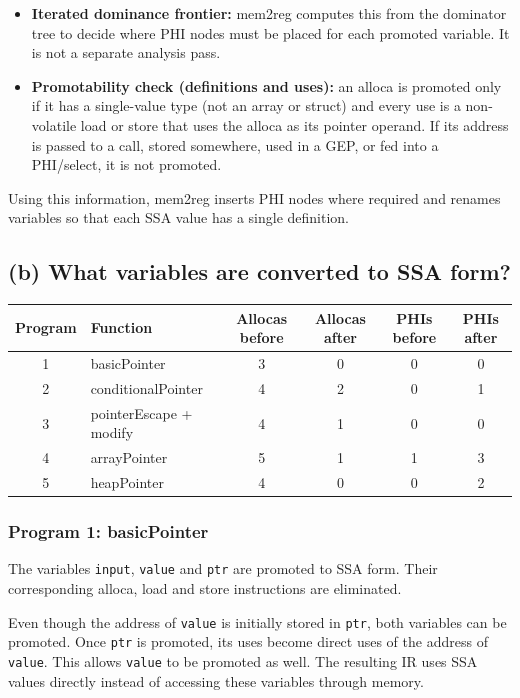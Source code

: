 \documentclass{article}
\providecommand{\tightlist}{\setlength{\itemsep}{0pt}\setlength{\parskip}{0pt}}
\begin{document}
\begin{itemize}
\tightlist
\item \textbf{Iterated dominance frontier:} mem2reg computes this from the
  dominator tree to decide where PHI nodes must be placed for each
  promoted variable. It is not a separate analysis pass.
\item \textbf{Promotability check (definitions and uses):} an alloca is
  promoted only if it has a single-value type (not an array or struct)
  and every use is a non-volatile load or store that uses the alloca as
  its pointer operand. If its address is passed to a call, stored
  somewhere, used in a GEP, or fed into a PHI/select, it is not promoted.
\end{itemize}

Using this information, mem2reg inserts PHI nodes where required and
renames variables so that each SSA value has a single definition.

\subsection{(b) What variables are converted to SSA form?}

\medskip
\noindent
\begin{tabular}{@{}c l c c c c@{}}
\toprule
Program & Function & Allocas before & Allocas after & PHIs before & PHIs after \\
\midrule
1 & basicPointer & 3 & 0 & 0 & 0 \\
2 & conditionalPointer & 4 & 2 & 0 & 1 \\
3 & pointerEscape + modify & 4 & 1 & 0 & 0 \\
4 & arrayPointer & 5 & 1 & 1 & 3 \\
5 & heapPointer & 4 & 0 & 0 & 2 \\
\bottomrule
\end{tabular}
\medskip

\subsubsection{Program 1: basicPointer}

The variables \texttt{input}, \texttt{value} and \texttt{ptr} are
promoted to SSA form. Their corresponding alloca, load and store
instructions are eliminated.

Even though the address of \texttt{value} is initially stored in
\texttt{ptr}, both variables can be promoted. Once \texttt{ptr} is
promoted, its uses become direct uses of the address of \texttt{value}.
This allows \texttt{value} to be promoted as well. The resulting IR uses
SSA values directly instead of accessing these variables through memory.
\end{document}

